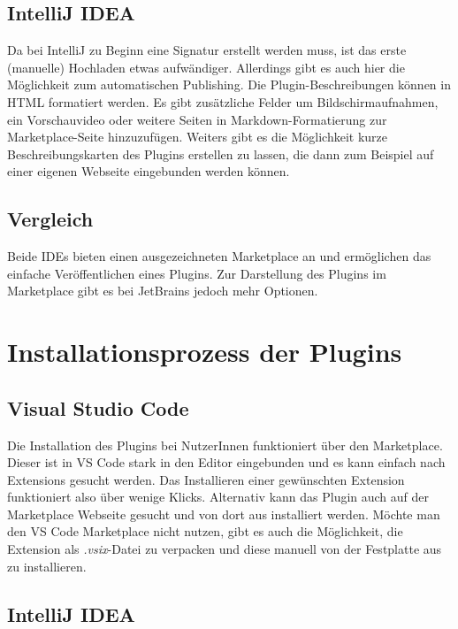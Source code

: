 \subsection{IntelliJ IDEA}

Da bei IntelliJ zu Beginn eine Signatur erstellt werden muss, ist das
erste (manuelle) Hochladen etwas aufwändiger. Allerdings
gibt es auch hier die Möglichkeit zum automatischen Publishing.
Die Plugin-Beschreibungen können in HTML formatiert werden. Es gibt
zusätzliche Felder um Bildschirmaufnahmen, ein Vorschauvideo oder
weitere Seiten in Markdown-Formatierung zur Marketplace-Seite
hinzuzufügen. Weiters gibt es die Möglichkeit kurze Beschreibungskarten
des Plugins erstellen zu lassen, die dann zum Beispiel auf 
einer eigenen Webseite eingebunden werden können.

\subsection{Vergleich}

Beide IDEs bieten einen ausgezeichneten Marketplace an
und ermöglichen das einfache Veröffentlichen eines Plugins.
Zur Darstellung des Plugins im Marketplace gibt es bei JetBrains
jedoch mehr Optionen.


\section{Installationsprozess der Plugins}
\label{sec:Vergleich_Installationsprozess}

\subsection{Visual Studio Code}

Die Installation des Plugins bei NutzerInnen funktioniert
über den Marketplace. Dieser ist in VS Code stark in den 
Editor eingebunden und es kann einfach nach 
Extensions gesucht werden. Das Installieren einer gewünschten
Extension funktioniert also über wenige Klicks.
Alternativ kann das Plugin auch auf der Marketplace Webseite
gesucht und von dort aus installiert werden.
Möchte man den VS Code Marketplace nicht nutzen, gibt es auch
die Möglichkeit, die Extension als \emph{.vsix}-Datei
zu verpacken und diese manuell von der Festplatte aus zu installieren.

\subsection{IntelliJ IDEA}

